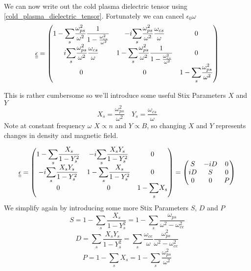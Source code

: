 We can now write out the cold plasma dielectric tensor using \eqref{cold_plasma_dielectric_tensor}. Fortunately we can cancel $\epsilon_0 \omega$
\begin{equation}
	\underline{\underline{\epsilon}} =
	\begin{pmatrix}
		1 - \displaystyle{\sum_s} \frac{\omega_{ps}^2}{\omega^2} \frac{1}{1 - \frac{\omega_{cs}^2}{\omega^2}} & -i \displaystyle{\sum_s} \frac{\omega_{ps}^2}{\omega^2} \frac{\omega_{cs}}{\omega} & 0 \\
		i \displaystyle{\sum_s} \frac{\omega_{ps}^2}{\omega^2} \frac{\omega_{cs}}{\omega} & 1 - \displaystyle{\sum_s} \frac{\omega_{ps}^2}{\omega^2} \frac{1}{1 - \frac{\omega_{cs}^2}{\omega^2}} & 0 \\
		0 & 0 & 1 - \displaystyle{\sum_s} \frac{\omega_{ps}^2}{\omega^2}
	\end{pmatrix}
\end{equation}

This is rather cumbersome so we'll introduce some useful Stix Parameters $X$ and $Y$
\begin{equation}
	X_s = \frac{\omega_{ps}^2}{\omega^2} \quad Y_s = \frac{\omega_{cs}}{\omega}
\end{equation}
Note at constant frequency $\omega$ $X \propto n$ and $Y \propto B$, so changing $X$ and $Y$ represents changes in density and magnetic field.

\begin{equation}
		\underline{\underline{\epsilon}} =
	\begin{pmatrix}
		1 - \displaystyle{\sum_s} \frac{X_s}{1 - Y_s^2} & -i \displaystyle{\sum_s} \frac{X_s Y_s}{1 - Y_s^2} & 0 \\
		-i \displaystyle{\sum_s} \frac{X_s Y_s}{1 - Y_s^2} & 1 - \displaystyle{\sum_s} \frac{X_s}{1 - Y_s^2} & 0 \\
		0 & 0 & 1 - \displaystyle{\sum_s} X_s
	\end{pmatrix} = 
	\begin{pmatrix}
		S & -iD & 0 \\
		iD & S & 0 \\
		0 & 0 & P
	\end{pmatrix}
\end{equation}
We simplify again by introducing some more Stix Parameters $S$, $D$ and $P$
\begin{equation}
	S = 1 - \sum_s \frac{X_s}{1 - Y_s^2} = 1 - \sum_s \frac{\omega_{ps}}{\omega^2 - \omega_{ce}^2}
\end{equation}
\begin{equation}
	D = \sum_s \frac{X_s Y_s}{1 - Y_s^2} = \sum_s \frac{\omega_{ce}}{\omega} \frac{\omega_{ps}^2}{\omega^2 - \omega_{ce}^2}
\end{equation}
\begin{equation}
	P = 1 - \sum_s X_s = 1 - \sum_s \frac{\omega_{ps}^2}{\omega^2}
\end{equation}

